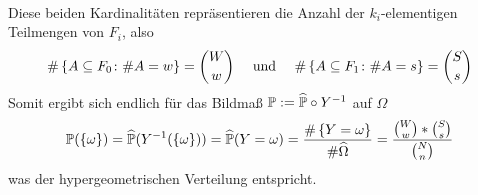 \begin{exercisePage}
\begin{enumerate}[leftmargin=*, label=(\alph*)]
\begin{equation*}
\begin{aligned}
			\end{aligned}
		\end{equation*} 
		Diese beiden Kardinalitäten repräsentieren die Anzahl der $k_i$-elementigen Teilmengen von $F_i$, also
		\begin{equation*}
			\# \left\{ A \subseteq F_0 \colon \# A = w \right\} = \binom{W}{w} \quad \text{ und } \quad \# \left\{ A \subseteq F_1 \colon \# A = s \right\} = \binom{S}{s}
		\end{equation*}
		Somit ergibt sich endlich für das Bildmaß $\mathbb{P} \mathrel{:=} \widehat{\mathbb{P}} \circ Y^{-1}$ auf $\Omega$
		\begin{equation*}
			\mathbb{P}(\left\{ \omega \right\}) = \widehat{\mathbb{P}}(Y^{-1}(\left\{ \omega \right\})) = \widehat{\mathbb{P}}(Y=\omega) = \frac{\# \left\{ Y = \omega \right\}}{\# \widehat{\Omega}} = \frac{\binom{W}{w} * \binom{S}{s}}{\binom{N}{n}}
		\end{equation*}
		was der hypergeometrischen Verteilung entspricht.
	\end{enumerate}

\end{exercisePage}

